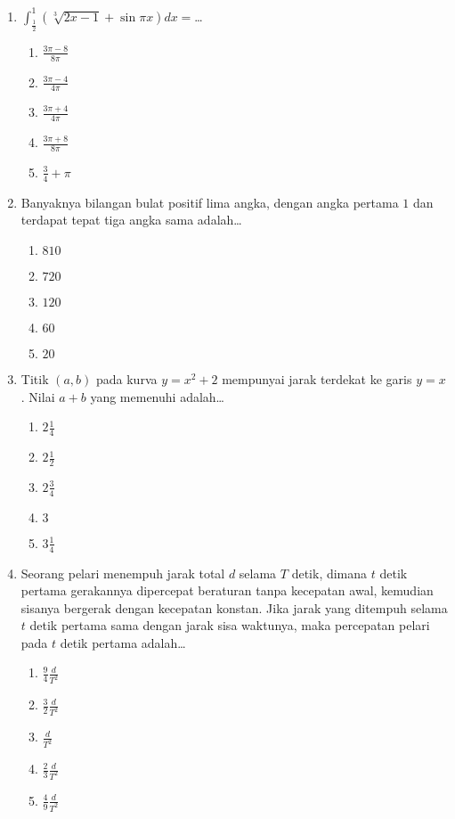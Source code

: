 \documentclass[A4,12PT, english, twocolumn]{journal}
\begin{document}
\begin{enumerate}
\item $\int_{\frac{1}{2}}^1 \left(\sqrt[3]{2x-1}+\sin{\pi x} \right)dx=$\dots
    \begin{enumerate}
        \item $\frac{3\pi -8}{8\pi}$
        \item $\frac{3\pi -4}{4\pi}$
        \item $\frac{3\pi +4}{4\pi}$
        \item $\frac{3\pi +8}{8\pi}$
        \item $\frac{3}{4}+\pi$
    \end{enumerate}

\item Banyaknya bilangan bulat positif lima angka, dengan angka pertama $1$ dan terdapat tepat tiga angka sama adalah\dots
    \begin{enumerate}
        \item $810$
        \item $720$
        \item $120$
        \item $60$
        \item $20$
    \end{enumerate}

\item Titik $(a,b)$ pada kurva $y=x^2+2$ mempunyai jarak terdekat ke garis $y=x$. Nilai $a+b$ yang memenuhi adalah\dots
    \begin{enumerate}
        \item $2\frac{1}{4}$
        \item $2\frac{1}{2}$
        \item $2\frac{3}{4}$
        \item $3$
        \item $3\frac{1}{4}$
    \end{enumerate}
    
    
\newpage
\item Seorang pelari menempuh jarak total $d$ selama $T$ detik, dimana $t$ detik pertama gerakannya dipercepat beraturan tanpa kecepatan awal, kemudian sisanya bergerak dengan kecepatan konstan. Jika jarak yang ditempuh selama $t$ detik pertama sama dengan jarak sisa waktunya, maka percepatan pelari pada $t$ detik pertama adalah\dots
    \begin{enumerate}
        \item $\frac{9}{4}\frac{d}{T^2}$
        \item $\frac{3}{2}\frac{d}{T^2}$
        \item $\frac{d}{T^2}$
        \item $\frac{2}{3}\frac{d}{T^2}$
        \item $\frac{4}{9}\frac{d}{T^2}$
    \end{enumerate}
  

\end{enumerate}
\end{document}
